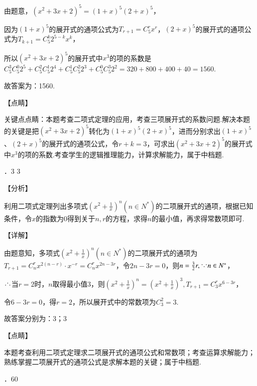 \documentclass[a4paper,11pt,UTF8,twoside]{ctexart} %
\begin{document}
\noindent 由题意，$(x^{2} +3x+2)^{5} =\left(1+x\right)^{5} \left(2+x\right)^{5} $，

\noindent 因为$\left(1+x\right)^{5} $的展开式的通项公式为$T_{r+1} =C_{5}^{r} x^{r} $，$\left(2+x\right)^{5} $的展开式的通项公式为$T_{k+1} =C_{5}^{k} 2^{5-k} x^{k} $，

\noindent 所以$(x^{2} +3x+2)^{5} $的展开式中$x^{3} $的项的系数是$C_{5}^{3} C_{5}^{0} 2^{5} +C_{5}^{2} C_{5}^{1} 2^{4} +C_{5}^{1} C_{5}^{2} 2^{3} +C_{5}^{0} C_{5}^{3} 2^{2} $$=320+800+400+40=1560$.

\noindent 故答案为：1560.

\noindent 【点睛】

\noindent 关键点点睛：本题考查二项式定理的应用，考查三项展开式的系数问题.解决本题的关键是把$(x^{2} +3x+2)^{5} $转化为$\left(1+x\right)^{5} \left(2+x\right)^{5} $，进而分别求出$\left(1+x\right)^{5} $、$\left(2+x\right)^{5} $的展开式的通项公式，令$r+k=3$，可求出$(x^{2} +3x+2)^{5} $的展开式中$x^{3} $的项的系数.考查学生的逻辑推理能力，计算求解能力，属于中档题.

．3    3    

\noindent 【分析】

\noindent 利用二项式定理列出多项式$\left(x^{2} +\frac{1}{x} \right)^{n} \left(n\in N^{*} \right)$的二项展开式的通项，根据已知条件，令$x$的指数为$0$得到关于$n,r$的方程，求得$n$的最小值，再求得常数项即可.

\noindent 【详解】

\noindent 由题意知，多项式$\left(x^{2} +\frac{1}{x} \right)^{n} \left(n\in N^{*} \right)$的二项展开式的通项为$T_{r+1} =C_{n}^{r} x^{2(n-r)} \cdot x^{-r} =C_{n}^{r} x^{2n-3r} $，令$2n-3r=0$，则$n=\frac{3}{2} r,{\mkern1mu\raise4pt\hbox{.}\mkern1mu\raise1pt\hbox{.}\mkern1mu\raise4pt\hbox{.}\mkern1mu} n\in N^{*} $，

\noindent ${\mkern1mu\raise1pt\hbox{.}\mkern1mu\raise4pt\hbox{.}\mkern1mu\raise1pt\hbox{.}\mkern1mu} $当$r=2$时，$n$取得最小值3，则$\left(x^{2} +\frac{1}{x} \right)^{n} =\left(x^{2} +\frac{1}{x} \right)^{3} ,T_{r+1} =C_{3}^{r} x^{6-3r} $，

\noindent 令$6-3r=0$，得$r=2$，所以展开式中的常数项为$C_{3}^{2} =3$.

\noindent 故答案分别为：$3$；$3$

\noindent 【点睛】

\noindent 本题考查利用二项式定理求二项展开式的通项公式和常数项；考查运算求解能力；熟练掌握二项展开式的通项公式是求解本题的关键；属于中档题.

．60
\end{document}

